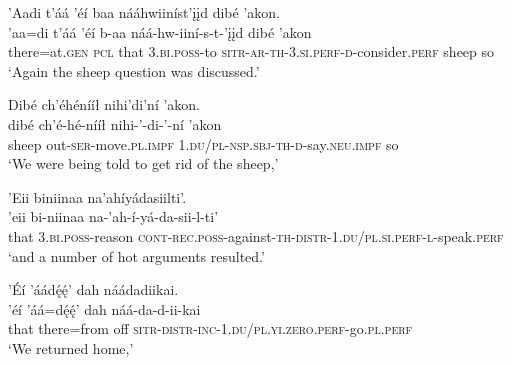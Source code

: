 \ea\label{ex:text7-7-2}
’Aadi t’áá ’éí baa nááhwiiníst’įįd dibé ’akon.\\
\gll ’aa=di	t’áá ’éí	b-aa	náá-hw-iiní-s-t-’įįd	dibé	’akon\\
     there=at.\textsc{gen}	\textsc{pcl} that	3.\textsc{bi}.\textsc{poss}-to	\textsc{sitr}-\textsc{ar}-\textsc{th}-3.\textsc{si}.\textsc{perf}-\textsc{d}-consider.\textsc{perf}	sheep	so\\
\glt `Again the sheep question was discussed.'
\z

\ea\label{ex:text7-7-3}
Dibé ch’éhénííł nihi’di’ní ’akon.\\
\gll dibé	ch’é-hé-nííł	nihi-’-di-’-ní	’akon\\
     sheep	out-\textsc{ser}-move.\textsc{pl}.\textsc{impf}	1.\textsc{du}/\textsc{pl}-\textsc{nsp}.\textsc{sbj}-\textsc{th}-\textsc{d}-say.\textsc{neu}.\textsc{impf}	so\\
\glt `We were being told to get rid of the sheep,'
\z

\ea\label{ex:text7-7-4}
’Eii biniinaa na’ahíyádasiilti’.\\
\gll ’eii	bi-niinaa	na-’ah-í-yá-da-sii-l-ti’\\
     that	3.\textsc{bi}.\textsc{poss}-reason	\textsc{cont}-\textsc{rec}.\textsc{poss}-against-\textsc{th}-\textsc{distr}-1.\textsc{du}/\textsc{pl}.\textsc{si}.\textsc{perf}-\textsc{l}-speak.\textsc{perf}\\
\glt `and a number of hot arguments resulted.'
\z

\ea\label{ex:text7-7-5}
’Éí ’áádę́ę́’ dah náádadiikai.\\
\gll ’éí	’áá=dę́ę́’	dah	náá-da-d-ii-kai\\
     that	there=from	off	\textsc{sitr}-\textsc{distr}-\textsc{inc}-1.\textsc{du}/\textsc{pl}.\textsc{yi}.\textsc{zero}.\textsc{perf}-go.\textsc{pl}.\textsc{perf}\\
\glt `We returned home,'
\z

